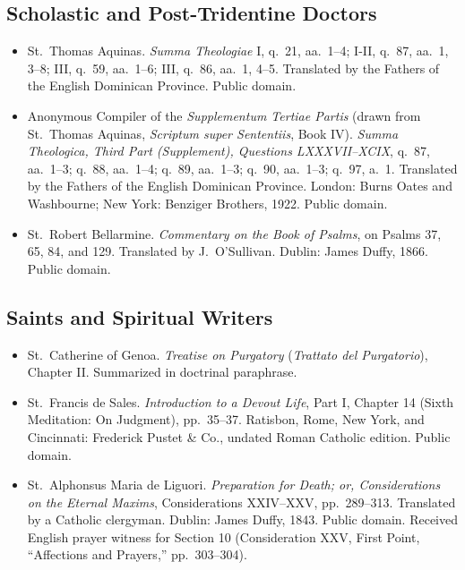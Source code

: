 \subsection*{Scholastic and Post-Tridentine Doctors}

\begin{itemize}
\item St.\ Thomas Aquinas. \textit{Summa Theologiae} I, q.\ 21, aa.\ 1--4; I-II, q.\ 87, aa.\ 1, 3--8; III, q.\ 59, aa.\ 1--6; III, q.\ 86, aa.\ 1, 4--5. Translated by the Fathers of the English Dominican Province. Public domain.
\item Anonymous Compiler of the \textit{Supplementum Tertiae Partis} (drawn from St.\ Thomas Aquinas, \textit{Scriptum super Sententiis}, Book IV). \textit{Summa Theologica, Third Part (Supplement), Questions LXXXVII--XCIX}, q.\ 87, aa.\ 1--3; q.\ 88, aa.\ 1--4; q.\ 89, aa.\ 1--3; q.\ 90, aa.\ 1--3; q.\ 97, a.\ 1. Translated by the Fathers of the English Dominican Province. London: Burns Oates and Washbourne; New York: Benziger Brothers, 1922. Public domain.
\item St.\ Robert Bellarmine. \textit{Commentary on the Book of Psalms}, on Psalms 37, 65, 84, and 129. Translated by J.\ O'Sullivan. Dublin: James Duffy, 1866. Public domain.
\end{itemize}

\subsection*{Saints and Spiritual Writers}

\begin{itemize}
\item St.\ Catherine of Genoa. \textit{Treatise on Purgatory} (\textit{Trattato del Purgatorio}), Chapter II. Summarized in doctrinal paraphrase.
\item St.\ Francis de Sales. \textit{Introduction to a Devout Life}, Part I, Chapter 14 (Sixth Meditation: On Judgment), pp.\ 35--37. Ratisbon, Rome, New York, and Cincinnati: Frederick Pustet \& Co., undated Roman Catholic edition. Public domain.
\item St.\ Alphonsus Maria de Liguori. \textit{Preparation for Death; or, Considerations on the Eternal Maxims}, Considerations XXIV--XXV, pp.\ 289--313. Translated by a Catholic clergyman. Dublin: James Duffy, 1843. Public domain. Received English prayer witness for Section 10 (Consideration XXV, First Point, ``Affections and Prayers,'' pp.\ 303--304).
\end{itemize}
\endgroup
